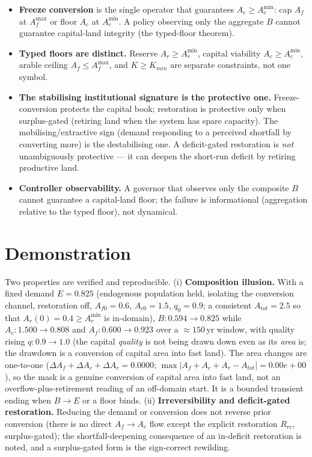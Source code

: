 \documentclass[11pt]{article}
\begin{document}
\begin{itemize}
\item \textbf{Freeze conversion} is the single operator that guarantees $A_c\ge A_c^{\min}$: cap $A_f$ at $A_f^{\max}$ or floor $A_c$ at $A_c^{\min}$. A policy observing only the aggregate $B$ cannot guarantee capital-land integrity (the typed-floor theorem).
\item \textbf{Typed floors are distinct.} Reserve $A_r\ge A_r^{\min}$, capital viability $A_c\ge A_c^{\min}$, arable ceiling $A_f\le A_f^{\max}$, and $K\ge K_{min}$ are separate constraints, not one symbol.
\item \textbf{The stabilising institutional signature is the protective one.} Freeze-conversion protects the capital book; restoration is protective only when surplus-gated (retiring land when the system has spare capacity). The mobilising/extractive sign (demand responding to a perceived shortfall by converting more) is the destabilising one. A deficit-gated restoration is \emph{not} unambiguously protective --- it can deepen the short-run deficit by retiring productive land.
\item \textbf{Controller observability.} A governor that observes only the composite $B$ cannot guarantee a capital-land floor; the failure is informational (aggregation relative to the typed floor), not dynamical.
\end{itemize}

\section{Demonstration}

Two properties are verified and reproducible. (i) \textbf{Composition illusion.} With a fixed demand $E=0.825$ (endogenous population held, isolating the conversion channel, restoration off, $A_{f0}=0.6$, $A_{c0}=1.5$, $q_0=0.9$; a consistent $A_{tot}=2.5$ so that $A_r(0)=0.4\ge A_r^{\min}$ is in-domain), $B:0.594\to0.825$ while $A_c:1.500\to0.808$ and $A_f:0.600\to0.923$ over a $\approx150$\,yr window, with quality rising $q:0.9\to1.0$ (the capital \emph{quality} is not being drawn down even as its \emph{area} is; the drawdown is a conversion of capital area into fast land). The area changes are one-to-one ($\Delta A_f+\Delta A_c+\Delta A_r=0.0000$; $\max|A_f+A_c+A_r-A_{tot}|=0.00e{+}00$), so the mask is a genuine conversion of capital area into fast land, not an overflow-plus-retirement reading of an off-domain start. It is a bounded transient ending when $B\to E$ or a floor binds. (ii) \textbf{Irreversibility and deficit-gated restoration.} Reducing the demand or conversion does not reverse prior conversion (there is no direct $A_f\to A_c$ flow except the explicit restoration $R_{rc}$, surplus-gated); the shortfall-deepening consequence of an in-deficit restoration is noted, and a surplus-gated form is the sign-correct rewilding.
\end{document}
